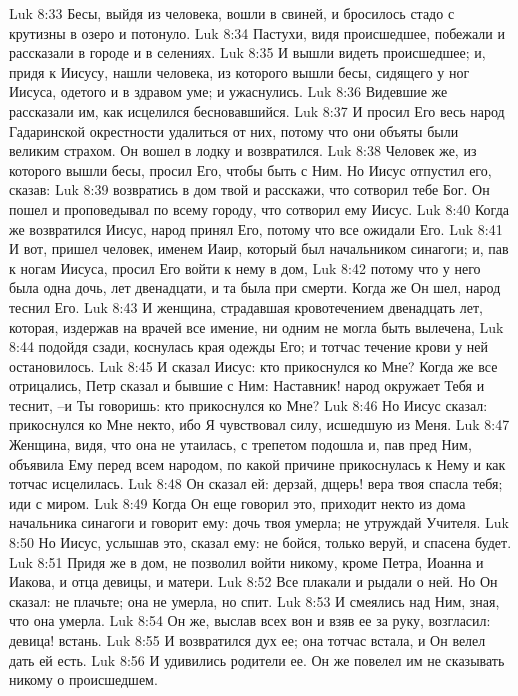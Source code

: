 Luk 8:33  Бесы, выйдя из человека, вошли в свиней, и бросилось стадо с крутизны в озеро и потонуло.
Luk 8:34  Пастухи, видя происшедшее, побежали и рассказали в городе и в селениях.
Luk 8:35  И вышли видеть происшедшее; и, придя к Иисусу, нашли человека, из которого вышли бесы, сидящего у ног Иисуса, одетого и в здравом уме; и ужаснулись.
Luk 8:36  Видевшие же рассказали им, как исцелился бесновавшийся.
Luk 8:37  И просил Его весь народ Гадаринской окрестности удалиться от них, потому что они объяты были великим страхом. Он вошел в лодку и возвратился.
Luk 8:38  Человек же, из которого вышли бесы, просил Его, чтобы быть с Ним. Но Иисус отпустил его, сказав:
Luk 8:39  возвратись в дом твой и расскажи, что сотворил тебе Бог. Он пошел и проповедывал по всему городу, что сотворил ему Иисус.
Luk 8:40  Когда же возвратился Иисус, народ принял Его, потому что все ожидали Его.
Luk 8:41  И вот, пришел человек, именем Иаир, который был начальником синагоги; и, пав к ногам Иисуса, просил Его войти к нему в дом,
Luk 8:42  потому что у него была одна дочь, лет двенадцати, и та была при смерти. Когда же Он шел, народ теснил Его.
Luk 8:43  И женщина, страдавшая кровотечением двенадцать лет, которая, издержав на врачей все имение, ни одним не могла быть вылечена,
Luk 8:44  подойдя сзади, коснулась края одежды Его; и тотчас течение крови у ней остановилось.
Luk 8:45  И сказал Иисус: кто прикоснулся ко Мне? Когда же все отрицались, Петр сказал и бывшие с Ним: Наставник! народ окружает Тебя и теснит, --и Ты говоришь: кто прикоснулся ко Мне?
Luk 8:46  Но Иисус сказал: прикоснулся ко Мне некто, ибо Я чувствовал силу, исшедшую из Меня.
Luk 8:47  Женщина, видя, что она не утаилась, с трепетом подошла и, пав пред Ним, объявила Ему перед всем народом, по какой причине прикоснулась к Нему и как тотчас исцелилась.
Luk 8:48  Он сказал ей: дерзай, дщерь! вера твоя спасла тебя; иди с миром.
Luk 8:49  Когда Он еще говорил это, приходит некто из дома начальника синагоги и говорит ему: дочь твоя умерла; не утруждай Учителя.
Luk 8:50  Но Иисус, услышав это, сказал ему: не бойся, только веруй, и спасена будет.
Luk 8:51  Придя же в дом, не позволил войти никому, кроме Петра, Иоанна и Иакова, и отца девицы, и матери.
Luk 8:52  Все плакали и рыдали о ней. Но Он сказал: не плачьте; она не умерла, но спит.
Luk 8:53  И смеялись над Ним, зная, что она умерла.
Luk 8:54  Он же, выслав всех вон и взяв ее за руку, возгласил: девица! встань.
Luk 8:55  И возвратился дух ее; она тотчас встала, и Он велел дать ей есть.
Luk 8:56  И удивились родители ее. Он же повелел им не сказывать никому о происшедшем.
